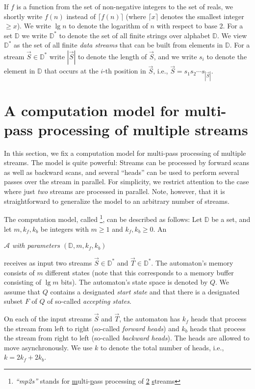 \documentclass[proceedings]{stacs}
\theoremstyle{plain}\newtheorem{satz}[thm]{Satz}
\theoremstyle{definition}\newtheorem{crucial}[thm]{Crucial Definition}
\newcommand{\vek}[1]{\vec{#1}}
\renewcommand*{\geq}{\ensuremath{\geqslant}}
\newcommand*{\A}{\ensuremath{\mathcal{A}}}
\newcommand{\DI}{\ensuremath{\mathbb{D}}}
\newcommand{\aut}{\text{mp2s-automaton}}
\newcommand{\auta}{\text{mp2s-automata}}
\newcommand{\kf}{\ensuremath{k_{\scriptscriptstyle f}}}
\newcommand{\kb}{\ensuremath{k_{\scriptscriptstyle b}}}
\begin{document}
If $f$ is a function from the set of non-negative integers to the set
of reals, we shortly write $f(n)$ instead of $\lceil f(n)\rceil$ (where
$\lceil x \rceil$ denotes the smallest integer $\geq x$).
We write $\lg n$ to denote the logarithm of $n$ with respect to base 2.
For a set $\DI$ we write $\DI^*$ to denote the set of all 
finite strings over alphabet $\DI$. We view $\DI^*$  as 
the set of all finite \emph{data streams} that can be built from 
elements in $\DI$.
For a stream $\vek{S}\in\DI^*$ write $|\vek{S}|$ to denote the
length of $\vek{S}$, and we write $s_i$ to denote the element 
in $\DI$ that occurs at the $i$-th position in $\vek{S}$, i.e., 
$\vek{S}= s_1 s_2\cdots s_{|\vek{S}|}$.


\section{A computation model for multi-pass processing of multiple streams}
\label{section:mpms-automata}

In this section, we fix a computation model for multi-pass processing
of multiple streams. 
The model is quite powerful: 
Streams can be processed by forward scans as well as backward scans, and
several ``heads'' can be used to perform several passes over the stream 
in parallel.
For simplicity, we restrict attention to the case
where just \emph{two} streams are processed in parallel.
Note, however, that it is straightforward to generalize the model to an
arbitrary number of streams.

The computation model, called
\emph{\auta}\footnote{\emph{``mp2s''} stands for 
\underline{m}ulti-\underline{p}ass processing of \underline{2} 
\underline{s}treams}, can be described as follows:
Let $\DI$ be a set, and let $m,\kf,\kb$ be integers with 
$m\geq 1$ and $\kf,\kb\geq 0$.
An \vspace{1ex} 
\begin{center}
  \emph{\aut{} $\A$ with parameters $(\DI,m,\kf,\kb)$}  \vspace{1ex}
\end{center}
receives as input two streams $\vek{S}\in\DI^*$ and $\vek{T}\in\DI^*$.
The automaton's memory consists of $m$ different states
(note that this corresponds to a memory buffer consisting of 
$\lg m$ bits). The automaton's state space is denoted by $Q$.
We assume that $Q$ contains a designated \emph{start state} and
that there is a designated subset $F$ of $Q$ of 
so-called \emph{accepting states}.

On each of the input streams $\vek{S}$ and $\vek{T}$, the automaton
has $\kf$ heads that process the stream from left to right 
(so-called \emph{forward heads}) and $\kb$ heads that process the stream 
from right to left (so-called \emph{backward heads}).
The heads are allowed to move asynchronously.
We use $k$ to denote the total number of heads, i.e., $k= 2\kf + 2\kb$.
\end{document}
